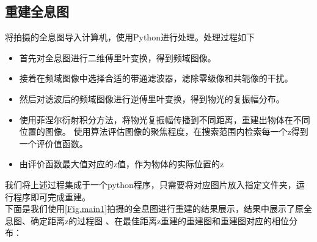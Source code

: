 \documentclass[a4paper,draft]{report} %
\begin{document}
\subsection{重建全息图}
将拍摄的全息图导入计算机，使用Python进行处理。处理过程如下\\
\begin{itemize}
    \item 首先对全息图进行二维傅里叶变换，得到频域图像。
    \item 接着在频域图像中选择合适的带通滤波器，滤除零级像和共轭像的干扰。
    \item 然后对滤波后的频域图像进行逆傅里叶变换，得到物光的复振幅分布。
    \item 使用菲涅尔衍射积分方法，将物光复振幅传播到不同距离，重建出物体在不同位置的图像。
    使用算法评估图像的聚焦程度，在搜索范围内检索每一个z得到一个评价值函数。
    \item 由评价函数最大值对应的z值，作为物体的实际位置的z
\end{itemize}
我们将上述过程集成于一个python程序，只需要将对应图片放入指定文件夹，运行程序即可完成重建。\\
下面是我们使用\ref{Fig.main1}拍摄的全息图进行重建的结果展示，结果中展示了原全息图、确定距离z的过程图
、在最佳距离z重建的重建图和重建图对应的相位分布：
\end{document}
